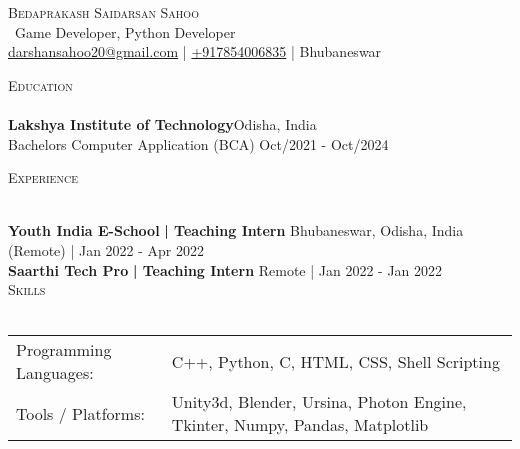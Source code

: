 \documentclass[a4paper]{article}
\newcommand{\lineunder} {
    \vspace*{-8pt} \\
    \hspace*{-18pt} \hrulefill \\
}
\newcommand{\header} [1] {
    {\hspace*{-18pt}\vspace*{6pt} \textsc{#1}}
    \vspace*{-6pt} \lineunder
}
\begin{document}
    \vspace*{-40pt}

    

%
%
  \vspace*{-2pt}
  \begin{center}
    {\Huge \scshape {Bedaprakash Saidarsan Sahoo}}\\
    \vspace*{2pt}
    \ {Game Developer, Python Developer}\\
    \vspace*{2pt}
    \href{mailto:darshansahoo20@gmail.com}{darshansahoo20@gmail.com} | \href{tel:+917854006835}{+917854006835} | Bhubaneswar\\
    \vspace*{2pt}
    
  \end{center}



      \header{Education}
      \vspace{2mm}
      \textbf{Lakshya Institute of Technology}\hfill Odisha, India\\
Bachelor\textquotesingle{}s Computer Application (BCA) \hfill Oct/2021 - Oct/2024\\

\vspace{2mm}

%
%
  \header{Experience}
  \vspace{2mm}

  \textbf{Youth India E-School}\textbf{ | Teaching Intern} \hfill Bhubaneswar, Odisha, India (Remote) | Jan 2022 - Apr 2022\\
  \textbf{Saarthi Tech Pro}\textbf{ | Teaching Intern} \hfill Remote | Jan 2022 - Jan 2022\\

%
%
  \header{Skills}
  \vspace{2mm}
  \begin{longtable}{p{4cm}p{12cm}}
  Programming Languages: & C++, Python, C, HTML, CSS, Shell Scripting \\
  Tools / Platforms: & Unity3d, Blender, Ursina, Photon Engine, Tkinter, Numpy, Pandas, Matplotlib \\
  \end{longtable}
  \vspace{1mm}
\end{document}
